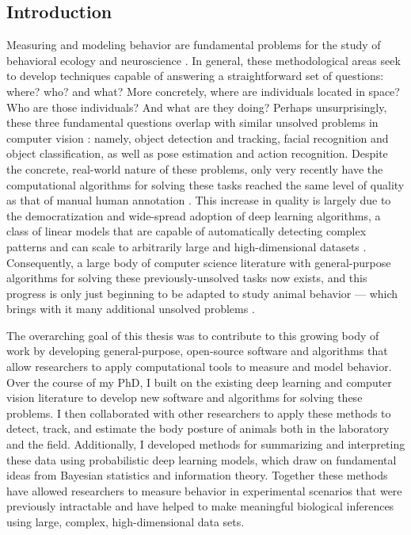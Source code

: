 \documentclass[11pt,a4paper,twoside]{book}
\begin{document}
\begin{doublespace}
	\chapter*{Introduction}
Measuring and modeling behavior are fundamental problems for the study of behavioral ecology and neuroscience \citep{berman2018measuring, brown2018ethology}. In general, these methodological areas seek to develop techniques capable of answering a straightforward set of questions: where? who? and what? More concretely, where are individuals located in space? Who are those individuals? And what are they doing? Perhaps unsurprisingly, these three fundamental questions overlap with similar unsolved problems in computer vision \citep{dell2014automated, lecun2015deep}: namely, object detection and tracking, facial recognition and object classification, as well as pose estimation and action recognition. Despite the concrete, real-world nature of these problems, only very recently have the computational algorithms for solving these tasks reached the same level of quality as that of manual human annotation \citep{lecun2015deep, goodfellow2016deep}. This increase in quality is largely due to the democratization and wide-spread adoption of deep learning algorithms, a class of linear models that are capable of automatically detecting complex patterns and can scale to arbitrarily large and high-dimensional datasets \citep{lecun2015deep, goodfellow2016deep}. Consequently, a large body of computer science literature with general-purpose algorithms for solving these previously-unsolved tasks now exists, and this progress is only just beginning to be adapted to study animal behavior \citep{mathis2018deeplabcut, pereira2019fast, graving2019deepposekit, gunel2019deepfly3d} --- which brings with it many additional unsolved problems \citep{graving2019deepposekit, mathis2020deep, mathis2020primer}.

The overarching goal of this thesis was to contribute to this growing body of work by developing general-purpose, open-source software and algorithms that allow researchers to apply computational tools to measure and model behavior. Over the course of my PhD, I built on the existing deep learning and computer vision literature to develop new software and algorithms for solving these problems. I then collaborated with other researchers to apply these methods to detect, track, and estimate the body posture of animals both in the laboratory and the field. Additionally, I developed methods for summarizing and interpreting these data using probabilistic deep learning models, which draw on fundamental ideas from Bayesian statistics and information theory. Together these methods have allowed researchers to measure behavior in experimental scenarios that were previously intractable and have helped to make meaningful biological inferences using large, complex, high-dimensional data sets.


\end{doublespace}
\end{document}
